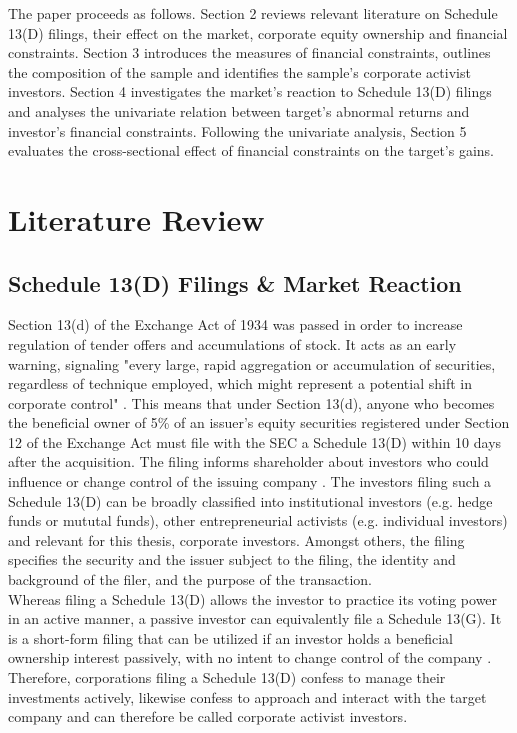 \documentclass[12pt]{article}
\begin{document}
The paper proceeds as follows. Section 2 reviews relevant literature on Schedule 13(D) filings, their effect on the market, corporate equity ownership and financial constraints. Section 3 introduces the measures of financial constraints, outlines the composition of the sample and identifies the sample's corporate activist investors. Section 4 investigates the market's reaction to Schedule 13(D) filings and analyses the univariate relation between target's abnormal returns and investor's financial constraints. Following the univariate analysis, Section 5 evaluates the cross-sectional effect of financial constraints on the target's gains.

\section{Literature Review}

\subsection{Schedule 13(D) Filings \& Market Reaction}

Section 13(d) of the Exchange Act of 1934 was passed in order to increase regulation of tender offers and accumulations of stock.
It acts as an early warning, signaling "every large, rapid aggregation or accumulation of securities, regardless of technique employed, which might represent a potential shift in corporate control" \citep[p.2]{Morrison2015}. 
This means that under Section 13(d), anyone who becomes the beneficial owner of 5\% of an issuer's equity securities registered under Section 12 of the Exchange Act must file with the SEC a Schedule 13(D) within 10 days after the acquisition. The filing informs shareholder about investors who could influence or change control of the issuing company \citep[p.110]{Giglia2016}. The investors filing such a Schedule 13(D) can be broadly classified into institutional investors (e.g. hedge funds or mututal funds), other entrepreneurial activists (e.g. individual investors) \citep[p.188]{Klein2009} and relevant for this thesis, corporate investors. Amongst others, the filing specifies the security and the issuer subject to the filing, the identity and background of the filer, and the purpose of the transaction.\\
Whereas filing a Schedule 13(D) allows the investor to practice its voting power in an active manner, a passive investor can equivalently file a Schedule 13(G). It is a short-form filing that can be utilized if an investor holds a beneficial ownership interest passively, with no intent to change control of the company \citep{Giglia2016}. Therefore, corporations filing a Schedule 13(D) confess to manage their investments actively, likewise confess to approach and interact with the target company and can therefore be called corporate activist investors. 
\end{document}
